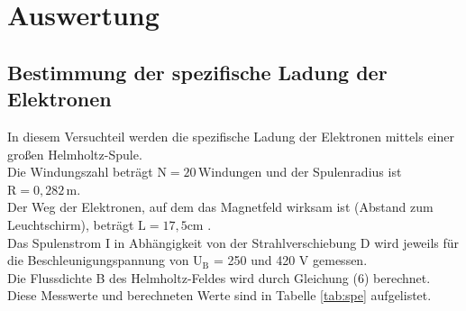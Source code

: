 \section{Auswertung}
\label{sec:Auswertung}
\subsection{Bestimmung der spezifische Ladung der Elektronen}
In diesem Versuchteil werden die spezifische Ladung der Elektronen mittels  einer  großen  Helmholtz-Spule.\\
Die Windungszahl beträgt $\text{N}=20 \,\text{Windungen}$ und der Spulenradius ist $\text{R}=0,282 \, \text{m}$.\\
Der Weg der Elektronen, auf dem das Magnetfeld wirksam ist (Abstand zum Leuchtschirm), beträgt $\text{L}=17,5 \text{cm}$ \cite{AL}.\\
Das Spulenstrom I in Abhängigkeit von der Strahlverschiebung D wird jeweils für die Beschleunigungspannung von $\text{U}_\text{B}$ = 250 und 420 V  gemessen.\\
Die  Flussdichte  B  des  Helmholtz-Feldes wird durch Gleichung (6) berechnet.\\
Diese Messwerte und berechneten Werte sind in Tabelle \ref{tab:spe} aufgelistet.

